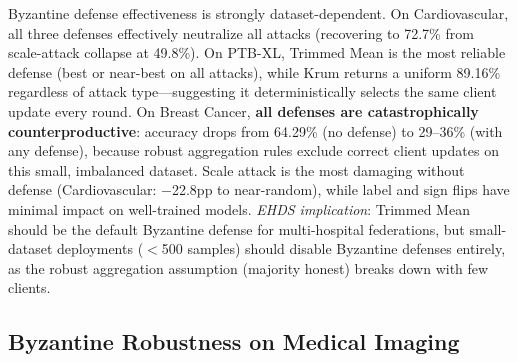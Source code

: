\documentclass[conference]{IEEEtran}
\begin{document}
\begin{table}[htbp]
\centering
\caption{Byzantine Robustness: Accuracy (\%) by Attack and Defense}
\label{tab:byzantine_extended}

\vspace{1mm}
\footnotesize{Byzantine defense effectiveness is strongly dataset-dependent. On Cardiovascular, all three defenses effectively neutralize all attacks (recovering to 72.7\% from scale-attack collapse at 49.8\%). On PTB-XL, Trimmed Mean is the most reliable defense (best or near-best on all attacks), while Krum returns a uniform 89.16\% regardless of attack type---suggesting it deterministically selects the same client update every round. On Breast Cancer, \textbf{all defenses are catastrophically counterproductive}: accuracy drops from 64.29\% (no defense) to 29--36\% (with any defense), because robust aggregation rules exclude correct client updates on this small, imbalanced dataset. Scale attack is the most damaging without defense (Cardiovascular: $-$22.8pp to near-random), while label and sign flips have minimal impact on well-trained models. \textit{EHDS implication}: Trimmed Mean should be the default Byzantine defense for multi-hospital federations, but small-dataset deployments ($<$500 samples) should disable Byzantine defenses entirely, as the robust aggregation assumption (majority honest) breaks down with few clients.}
\end{table}

\subsection{Byzantine Robustness on Medical Imaging}
\label{sec:byzantine_imaging}
\end{document}
